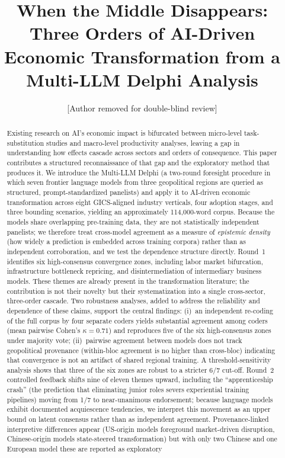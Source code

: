 \documentclass[preprint,review,12pt]{elsarticle}
\begin{document}
\begin{frontmatter}

\title{When the Middle Disappears: Three Orders of AI-Driven Economic Transformation from a Multi-LLM Delphi Analysis}

\author[anon]{[Author removed for double-blind review]}

\address[anon]{[Affiliation removed for double-blind review]}

\begin{abstract}
Existing research on AI's economic impact is bifurcated between micro-level task-substitution studies and macro-level productivity analyses, leaving a gap in understanding how effects cascade across sectors and orders of consequence. This paper contributes a structured reconnaissance of that gap and the exploratory method that produces it. We introduce the Multi-LLM Delphi (a two-round foresight procedure in which seven frontier language models from three geopolitical regions are queried as structured, prompt-standardized panelists) and apply it to AI-driven economic transformation across eight GICS-aligned industry verticals, four adoption stages, and three bounding scenarios, yielding an approximately 114,000-word corpus. Because the models share overlapping pre-training data, they are not statistically independent panelists; we therefore treat cross-model agreement as a measure of \emph{epistemic density} (how widely a prediction is embedded across training corpora) rather than as independent corroboration, and we test the dependence structure directly. Round~1 identifies six high-consensus convergence zones, including labor market bifurcation, infrastructure bottleneck repricing, and disintermediation of intermediary business models. These themes are already present in the transformation literature; the contribution is not their novelty but their systematization into a single cross-sector, three-order cascade. Two robustness analyses, added to address the reliability and dependence of these claims, support the central findings: (i)~an independent re-coding of the full corpus by four separate coders yields substantial agreement among coders (mean pairwise Cohen's $\kappa=0.71$) and reproduces five of the six high-consensus zones under majority vote; (ii)~pairwise agreement between models does not track geopolitical provenance (within-bloc agreement is no higher than cross-bloc) indicating that convergence is not an artifact of shared regional training. A threshold-sensitivity analysis shows that three of the six zones are robust to a stricter 6/7 cut-off. Round~2 controlled feedback shifts nine of eleven themes upward, including the ``apprenticeship crash'' (the prediction that eliminating junior roles severs experiential training pipelines) moving from 1/7 to near-unanimous endorsement; because language models exhibit documented acquiescence tendencies, we interpret this movement as an upper bound on latent consensus rather than as independent agreement. Provenance-linked interpretive differences appear (US-origin models foreground market-driven disruption, Chinese-origin models state-steered transformation) but with only two Chinese and one European model these are reported as exploratory 
\end{abstract}
\end{frontmatter}
\end{document}
